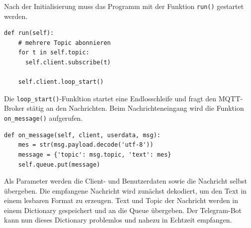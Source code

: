 \documentclass[12pt, letterpaper]{article}
\begin{document}
\par Nach der Initialisierung muss das Programm mit der Funktion \texttt{run()} gestartet werden.
\begin{Verbatim}[frame=single]
  def run(self):
    # mehrere Topic abonnieren
    for t in self.topic:
      self.client.subscribe(t)
    
    self.client.loop_start()
\end{Verbatim}
\par Die \texttt{loop\_start()}-Funkltion startet eine Endlosschleife und fragt den MQTT-Broker stätig an den Nachrichten. Beim Nachrichteneingang wird die Funktion \texttt{on\_message()} aufgerufen. 
\begin{Verbatim}[frame=single]
  def on_message(self, client, userdata, msg):
    mes = str(msg.payload.decode('utf-8'))
    message = {'topic': msg.topic, 'text': mes}
    self.queue.put(message)
\end{Verbatim}
\par Als Parameter werden die Client- und Benutzerdaten sowie die Nachricht selbst übergeben. Die empfangene Nachricht wird zunächst dekodiert, um den Text in einem lesbaren Format zu erzeugen. Text und Topic der Nachricht werden in einem Dictionary gespeichert und an die Queue übergeben. Der Telegram-Bot kann nun dieses Dictionary problemlos und nahezu in Echtzeit empfangen.
\end{document}
